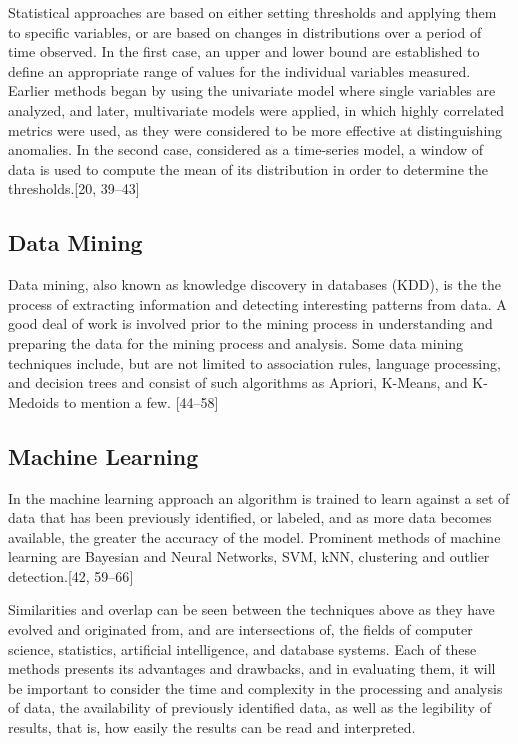 \documentclass[11pt,]{article}
\begin{document}
Statistical approaches are based on either setting thresholds and
applying them to specific variables, or are based on changes in
distributions over a period of time observed. In the first case, an
upper and lower bound are established to define an appropriate range of
values for the individual variables measured. Earlier methods began by
using the univariate model where single variables are analyzed, and
later, multivariate models were applied, in which highly correlated
metrics were used, as they were considered to be more effective at
distinguishing anomalies. In the second case, considered as a
time-series model, a window of data is used to compute the mean of its
distribution in order to determine the thresholds.{[}20, 39--43{]}

\subsection{Data Mining}\label{data-mining}

Data mining, also known as knowledge discovery in databases (KDD), is
the the process of extracting information and detecting interesting
patterns from data. A good deal of work is involved prior to the mining
process in understanding and preparing the data for the mining process
and analysis. Some data mining techniques include, but are not limited
to association rules, language processing, and decision trees and
consist of such algorithms as Apriori, K-Means, and K-Medoids to mention
a few. {[}44--58{]}

\subsection{Machine Learning}\label{machine-learning}

In the machine learning approach an algorithm is trained to learn
against a set of data that has been previously identified, or labeled,
and as more data becomes available, the greater the accuracy of the
model. Prominent methods of machine learning are Bayesian and Neural
Networks, SVM, kNN, clustering and outlier detection.{[}42, 59--66{]}

Similarities and overlap can be seen between the techniques above as
they have evolved and originated from, and are intersections of, the
fields of computer science, statistics, artificial intelligence, and
database systems. Each of these methods presents its advantages and
drawbacks, and in evaluating them, it will be important to consider the
time and complexity in the processing and analysis of data, the
availability of previously identified data, as well as the legibility of
results, that is, how easily the results can be read and interpreted.
\end{document}
